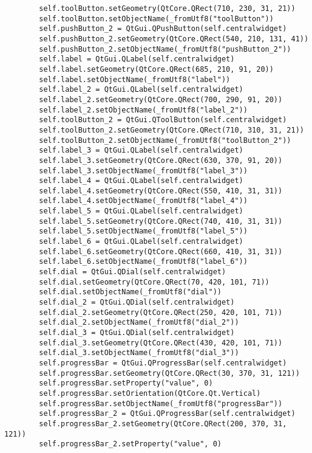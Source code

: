 \begin{lstlisting}
        self.toolButton.setGeometry(QtCore.QRect(710, 230, 31, 21))
        self.toolButton.setObjectName(_fromUtf8("toolButton"))
        self.pushButton_2 = QtGui.QPushButton(self.centralwidget)
        self.pushButton_2.setGeometry(QtCore.QRect(540, 210, 131, 41))
        self.pushButton_2.setObjectName(_fromUtf8("pushButton_2"))
        self.label = QtGui.QLabel(self.centralwidget)
        self.label.setGeometry(QtCore.QRect(685, 210, 91, 20))
        self.label.setObjectName(_fromUtf8("label"))
        self.label_2 = QtGui.QLabel(self.centralwidget)
        self.label_2.setGeometry(QtCore.QRect(700, 290, 91, 20))
        self.label_2.setObjectName(_fromUtf8("label_2"))
        self.toolButton_2 = QtGui.QToolButton(self.centralwidget)
        self.toolButton_2.setGeometry(QtCore.QRect(710, 310, 31, 21))
        self.toolButton_2.setObjectName(_fromUtf8("toolButton_2"))
        self.label_3 = QtGui.QLabel(self.centralwidget)
        self.label_3.setGeometry(QtCore.QRect(630, 370, 91, 20))
        self.label_3.setObjectName(_fromUtf8("label_3"))
        self.label_4 = QtGui.QLabel(self.centralwidget)
        self.label_4.setGeometry(QtCore.QRect(550, 410, 31, 31))
        self.label_4.setObjectName(_fromUtf8("label_4"))
        self.label_5 = QtGui.QLabel(self.centralwidget)
        self.label_5.setGeometry(QtCore.QRect(740, 410, 31, 31))
        self.label_5.setObjectName(_fromUtf8("label_5"))
        self.label_6 = QtGui.QLabel(self.centralwidget)
        self.label_6.setGeometry(QtCore.QRect(660, 410, 31, 31))
        self.label_6.setObjectName(_fromUtf8("label_6"))
        self.dial = QtGui.QDial(self.centralwidget)
        self.dial.setGeometry(QtCore.QRect(70, 420, 101, 71))
        self.dial.setObjectName(_fromUtf8("dial"))
        self.dial_2 = QtGui.QDial(self.centralwidget)
        self.dial_2.setGeometry(QtCore.QRect(250, 420, 101, 71))
        self.dial_2.setObjectName(_fromUtf8("dial_2"))
        self.dial_3 = QtGui.QDial(self.centralwidget)
        self.dial_3.setGeometry(QtCore.QRect(430, 420, 101, 71))
        self.dial_3.setObjectName(_fromUtf8("dial_3"))
        self.progressBar = QtGui.QProgressBar(self.centralwidget)
        self.progressBar.setGeometry(QtCore.QRect(30, 370, 31, 121))
        self.progressBar.setProperty("value", 0)
        self.progressBar.setOrientation(QtCore.Qt.Vertical)
        self.progressBar.setObjectName(_fromUtf8("progressBar"))
        self.progressBar_2 = QtGui.QProgressBar(self.centralwidget)
        self.progressBar_2.setGeometry(QtCore.QRect(200, 370, 31, 121))
        self.progressBar_2.setProperty("value", 0)

\end{lstlisting}
